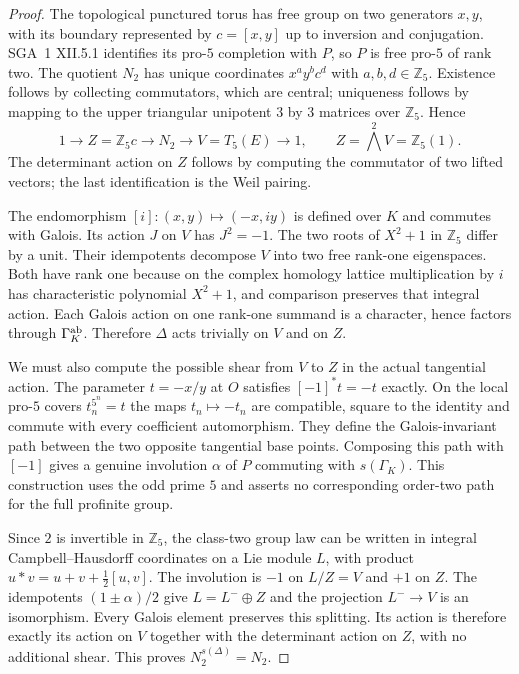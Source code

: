 \begin{proof}
The topological punctured torus has free group on two generators $x,y$, with its boundary represented by $c=[x,y]$ up to inversion and conjugation. SGA~1 XII.5.1 identifies its pro-$5$ completion with $P$, so $P$ is free pro-$5$ of rank two. The quotient $N_2$ has unique coordinates $x^a y^b c^d$ with $a,b,d\in\mathbb Z_5$. Existence follows by collecting commutators, which are central; uniqueness follows by mapping to the upper triangular unipotent $3$ by $3$ matrices over $\mathbb Z_5$. Hence
\[
 1\longrightarrow Z=\mathbb Z_5c\longrightarrow N_2
 \longrightarrow V=T_5(E)\longrightarrow1,
 \qquad Z=\bigwedge^2V=\mathbb Z_5(1).
\]
The determinant action on $Z$ follows by computing the commutator of two lifted vectors; the last identification is the Weil pairing.

The endomorphism $[i]:(x,y)\mapsto(-x,iy)$ is defined over $K$ and commutes with Galois. Its action $J$ on $V$ has $J^2=-1$. The two roots of $X^2+1$ in $\mathbb Z_5$ differ by a unit. Their idempotents decompose $V$ into two free rank-one eigenspaces. Both have rank one because on the complex homology lattice multiplication by $i$ has characteristic polynomial $X^2+1$, and comparison preserves that integral action. Each Galois action on one rank-one summand is a character, hence factors through $\Gamma_K^{\rm ab}$. Therefore $\Delta$ acts trivially on $V$ and on $Z$.

We must also compute the possible shear from $V$ to $Z$ in the actual tangential action. The parameter $t=-x/y$ at $O$ satisfies $[-1]^*t=-t$ exactly. On the local pro-$5$ covers $t_n^{5^n}=t$ the maps $t_n\mapsto-t_n$ are compatible, square to the identity and commute with every coefficient automorphism. They define the Galois-invariant path between the two opposite tangential base points. Composing this path with $[-1]$ gives a genuine involution $\alpha$ of $P$ commuting with $s(\Gamma_K)$. This construction uses the odd prime $5$ and asserts no corresponding order-two path for the full profinite group.

Since $2$ is invertible in $\mathbb Z_5$, the class-two group law can be written in integral Campbell--Hausdorff coordinates on a Lie module $L$, with product $u*v=u+v+\tfrac12[u,v]$. The involution is $-1$ on $L/Z=V$ and $+1$ on $Z$. The idempotents $(1\pm\alpha)/2$ give $L=L^-\oplus Z$ and the projection $L^-\to V$ is an isomorphism. Every Galois element preserves this splitting. Its action is therefore exactly its action on $V$ together with the determinant action on $Z$, with no additional shear. This proves $N_2^{s(\Delta)}=N_2$.


\end{proof}
